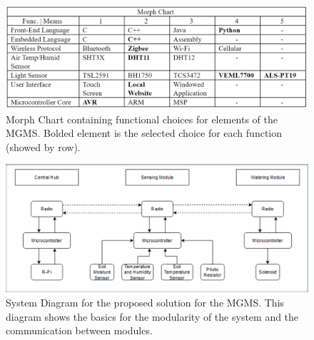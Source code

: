 \documentclass{report}
\begin{document}
\begin{figure}[H]
    \centering
    \includegraphics[width=\linewidth]{PNGs/MorphChart.PNG}
    \caption{Morph Chart containing functional choices for elements of the MGMS. Bolded element is the selected choice for each function (showed by row). }
    \label{fig:morph_chart}
\end{figure}


\begin{figure}[H]
    \centering
    \includegraphics[width=15cm]{PNGs/SystemDesign.PNG}
    \caption{System Diagram for the proposed solution for the MGMS. This diagram shows the basics for the modularity of the system and the communication between modules.}
    \label{fig:sys_diagram}
\end{figure}
\end{document}
